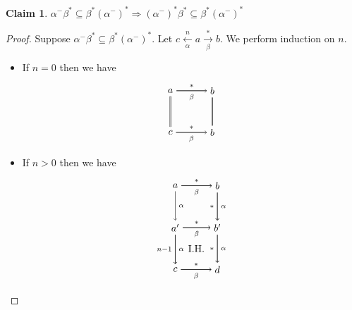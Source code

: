 \documentclass[autodetect-enginem]{article}
\theoremstyle{plain}
\theoremstyle{definition}
\newtheorem*{claim*}{Claim}
\begin{document}
\begin{claim*}
    $\alpha^-\beta^* \subseteq \beta^*(\alpha^-)^* \Rightarrow (\alpha^-)^*\beta^* \subseteq \beta^*(\alpha^-)^*$
\end{claim*}

\begin{proof}
    Suppose $\alpha^-\beta^* \subseteq \beta^*(\alpha^-)^*$.
    Let $c \xleftarrow[\alpha]{n} a \xrightarrow[\beta]{*} b$.
    We perform induction on $n$.
    \begin{itemize}
        \item If $n = 0$ then we have
            \[
            \begin{tikzpicture}[auto]
                \node (a) at (0,0) {$a$}; \node (b) at (1.5,0) {$b$};
                \node (c) at (0,-1.5) {$c$}; \node (b') at (1.5,-1.5) {$b$};
                \draw[->] (a) to node[above]{$\scriptstyle *$} (b);
                \draw[] (a) to node[below]{$\scriptstyle \beta$} (b);

                \draw[double] (a) to (c);

                \draw[double] (b) to (b');

                \draw[->] (c) to node[above]{$\scriptstyle *$} (b');
                \draw[] (c) to node[below]{$\scriptstyle \beta$} (b');

            \end{tikzpicture}
        \]
        \item If $n > 0$ then we have
            \[
                \begin{tikzpicture}[auto]
                \node (a) at (0,0) {$a$}; \node (b) at (1.5, 0) {$b$};
                \node (a') at (0, -1.5) {$a'$}; \node (b') at (1.5, -1.5) {$b'$};
                \node (c) at (0, -3) {$c$}; \node (d) at (1.5,-3) {$d$};
                \node (IH) at (0.75, -(1.5 + 0.75) {I.H.};

                \draw[->] (a) to node[above]{$\scriptstyle *$} (b);
                \draw[->] (a) to node[below]{$\scriptstyle \beta$} (b);
                
                \draw[->] (a) to node{$\scriptstyle \alpha$} (a');
                
                \draw[->] (a') to node[swap]{$\scriptstyle n-1$} (c);
                \draw[->] (a') to node{$\scriptstyle \alpha$} (c);

                \draw[->] (b) to node[swap]{$\scriptstyle *$} (b');
                \draw[->] (b) to node{$\scriptstyle \alpha$} (b');

                \draw[->] (b') to node[swap]{$\scriptstyle *$} (d);
                \draw[->] (b') to node{$\scriptstyle \alpha$} (d);

                \draw[->] (c) to node[above]{$\scriptstyle *$} (d);
                \draw[->] (c) to node[below]{$\scriptstyle \beta$} (d);

                \draw[->] (a') to node[above]{$\scriptstyle *$} (b');
                \draw[->] (a') to node[below]{$\scriptstyle \beta$} (b');
            \end{tikzpicture}
        \]
    \end{itemize}
\end{proof}
\end{document}
